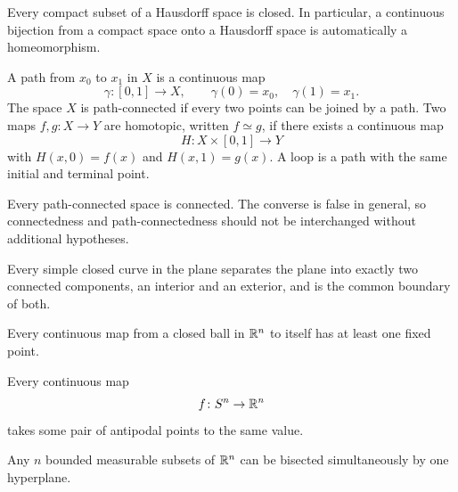     \begin{theorem}
        Every compact subset of a Hausdorff space is closed. In particular, a
        continuous bijection from a compact space onto a Hausdorff space is
        automatically a homeomorphism.
    \end{theorem}

    \begin{definition}
        A path from $x_0$ to $x_1$ in $X$ is a continuous map
        \[
            \gamma\colon [0,1]\to X,
            \qquad
            \gamma(0)=x_0,
            \quad
            \gamma(1)=x_1.
        \]
        The space $X$ is path-connected if every two points can be joined by a
        path. Two maps $f,g\colon X\to Y$ are homotopic, written $f\simeq g$, if
        there exists a continuous map
        \[
            H\colon X\times[0,1]\to Y
        \]
        with $H(x,0)=f(x)$ and $H(x,1)=g(x)$. A loop is a path with the same
        initial and terminal point.
    \end{definition}

    \begin{theorem}
        Every path-connected space is connected. The converse is false in
        general, so connectedness and path-connectedness should not be
        interchanged without additional hypotheses.
    \end{theorem}

    \begin{theorem}
        Every simple closed curve in the plane separates the plane into exactly
        two connected components, an interior and an exterior, and is the
        common boundary of both.
    \end{theorem}

    \begin{theorem}
        Every continuous map from a closed ball in $\mathbb{R}^n$ to itself has at least
        one fixed point.
    \end{theorem}

    \begin{theorem}
        Every continuous map
        \[
            f\colon S^n\to\mathbb{R}^n
        \]
        takes some pair of antipodal points to the same value.
    \end{theorem}

    \begin{corollary}
        Any $n$ bounded measurable subsets of $\mathbb{R}^n$ can be bisected
        simultaneously by one hyperplane.
    \end{corollary}

